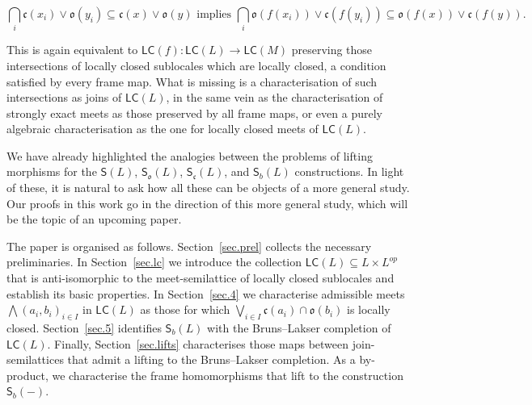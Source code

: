 \documentclass[11pt,a4paper,reqno]{amsart}
\newcommand{\tbigwedge}{\mathop{\textstyle \bigwedge }}%
\def\SS{\mathsf{S}}
\def\cl{\mathfrak{c}}
\def\op{\mathfrak{o}}
\theoremstyle{definition}
\theoremstyle{remark}
\newcommand{\mf}{\mathsf}
\newcommand{\se}{\subseteq}
\newcommand{\ve}{\vee}
\newcommand{\bca}{\bigcap}
\newcommand{\So}{\mf{S}_{\op}}
\newcommand{\Sc}{\mf{S}_{\cl}}
\newcommand{\Sb}{\mf{S}_b}
\begin{document}
\begin{equation*}
\bca_i \cl(x_i)\ve \op(y_i)\se \cl(x)\ve \op(y)\text{ implies }\bca_i \op(f(x_i))\ve \cl(f(y_i))\se \op(f(x))\ve \cl(f(y)).   \tag{WDs} \label{e: wds}
\end{equation*}

This is again equivalent to $\mf{LC}(f):\mf{LC}(L)\to \mf{LC}(M)$ preserving those intersections of locally closed sublocales which are locally closed, a condition satisfied by every frame map. What is missing is a characterisation of such intersections as joins of $\mf{LC}(L)$, in the same vein as the characterisation of strongly exact meets as those preserved by all frame maps, or even a purely algebraic characterisation as the one for locally closed meets of $\mf{LC}(L)$.


We have already highlighted the analogies between the problems of lifting morphisms for the $\mf{S}(L)$, $\So(L)$, $\Sc(L)$, and $\Sb(L)$ constructions. In light of these, it is natural to ask how all these can be objects of a more general study. Our proofs in this work go in the direction of this more general study, which will be the topic of an upcoming paper.


The paper is organised as follows. Section~\ref{sec.prel} collects the necessary preliminaries. In Section~\ref{sec.lc} we introduce the collection $\mathsf{LC}(L)\subseteq L\times L^{op}$ that is anti-isomorphic to the meet-semilattice of locally closed sublocales and establish its basic properties. In Section~\ref{sec.4} we characterise admissible meets $\tbigwedge{(a_i,b_i)}_{i\in I}$ in $\mathsf{LC}(L)$ as those for which $\bigvee_{i\in I}\cl(a_i)\cap\op(b_i)$ is locally closed. Section~\ref{sec.5} identifies $\SS_b(L)$ with the Bruns–Lakser completion of $\mathsf{LC}(L)$. Finally, Section~\ref{sec.lifts} characterises those maps between join-semilattices that admit a lifting to the Bruns–Lakser completion. As a by-product, we characterise the frame homomorphisms that lift to the construction $\SS_b(-)$.

\end{document}
